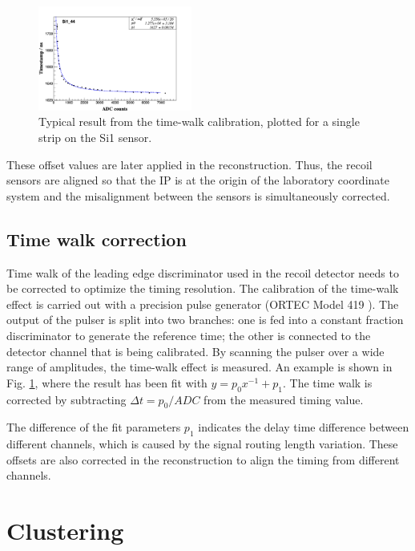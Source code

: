 \documentclass[number,5p]{elsarticle}
\begin{document}
\begin{figure}[h!]
  \centering
  \includegraphics[width=0.45\textwidth]{./timewalk.png}
  \caption{Typical result from the time-walk calibration, plotted for a single
    strip on the Si1 sensor.}
  \label{fig:timewalk}
\end{figure}

These offset values are later applied in the reconstruction.
Thus, the recoil sensors are aligned so that the IP is at the origin of the
laboratory coordinate system and the misalignment between the sensors is
simultaneously corrected.

\subsection{Time walk correction}
\label{sec:timewalk}

Time walk of the leading edge discriminator used in the recoil detector needs to be corrected to optimize the timing resolution.
The calibration of the time-walk effect is carried out with a precision pulse generator (ORTEC Model 419 \cite{ortec}). 
The output of the pulser is split into two branches: one is fed into a constant fraction discriminator to generate the reference time;
the other is connected to the detector channel that is being calibrated. 
By scanning the pulser over a wide range of amplitudes, the time-walk effect is measured.
An example is shown in Fig. \ref{fig:timewalk}, where the result has been fit with \(y=p_0 x^{-1} + p_1\). 
The time walk is corrected by subtracting \(\Delta t = p_0/ADC\) from the measured timing value.

The difference of the fit parameters \(p_1\) indicates the delay time
difference between different channels, which is caused by the signal routing length variation.
These offsets are also corrected in the reconstruction to align the timing from different channels.

\section{Clustering}
\label{sec:clustering}
\end{document}

